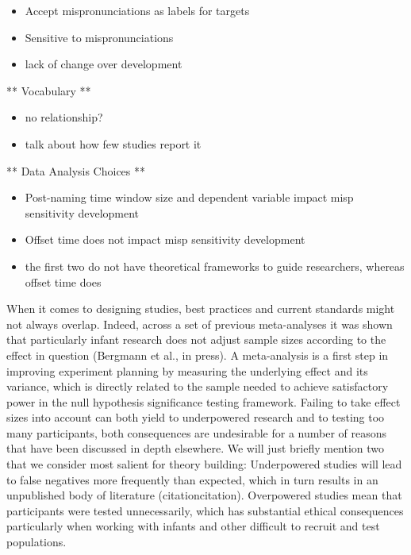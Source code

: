 \documentclass[man]{apa6}
\providecommand{\tightlist}{%
  \setlength{\itemsep}{0pt}\setlength{\parskip}{0pt}}
\theoremstyle{definition}
\theoremstyle{definition}
\theoremstyle{definition}
\theoremstyle{remark}
\begin{document}
\begin{itemize}
\tightlist
\item
  Accept mispronunciations as labels for targets
\item
  Sensitive to mispronunciations
\item
  lack of change over development
\end{itemize}

** Vocabulary **

\begin{itemize}
\tightlist
\item
  no relationship?
\item
  talk about how few studies report it
\end{itemize}

** Data Analysis Choices **

\begin{itemize}
\tightlist
\item
  Post-naming time window size and dependent variable impact misp
  sensitivity development
\item
  Offset time does not impact misp sensitivity development
\item
  the first two do not have theoretical frameworks to guide researchers,
  whereas offset time does
\end{itemize}

When it comes to designing studies, best practices and current standards
might not always overlap. Indeed, across a set of previous meta-analyses
it was shown that particularly infant research does not adjust sample
sizes according to the effect in question (Bergmann et al., in press). A
meta-analysis is a first step in improving experiment planning by
measuring the underlying effect and its variance, which is directly
related to the sample needed to achieve satisfactory power in the null
hypothesis significance testing framework. Failing to take effect sizes
into account can both yield to underpowered research and to testing too
many participants, both consequences are undesirable for a number of
reasons that have been discussed in depth elsewhere. We will just
briefly mention two that we consider most salient for theory building:
Underpowered studies will lead to false negatives more frequently than
expected, which in turn results in an unpublished body of literature
(citationcitation). Overpowered studies mean that participants were
tested unnecessarily, which has substantial ethical consequences
particularly when working with infants and other difficult to recruit
and test populations.
\end{document}
